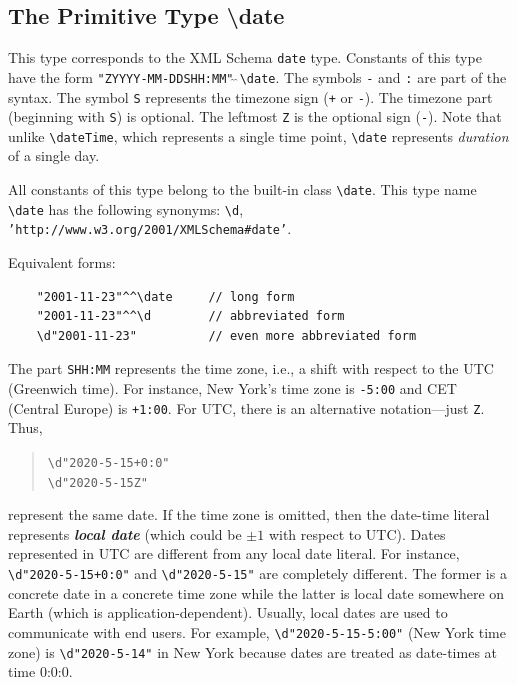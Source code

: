 \documentclass[11pt]{article}
\newcommand{\bs}{\textbackslash}
\begin{document}
\subsection{ The Primitive Type \bs{}date}

\index{datatype!\bs{}date}
This type corresponds to the XML Schema {\tt date} type.  Constants of this
type have the form {\tt "ZYYYY-MM-DDSHH:MM"$\hat{~}\hat{~}$\bs{}date}.  The
symbols {\tt -} and {\tt :} are part of the syntax. The symbol {\tt S}
represents the timezone sign ({\tt +} or {\tt -}). The timezone part
(beginning with {\tt S}) is optional. The leftmost {\tt Z} is the optional
sign ({\tt -}). Note that unlike {\tt \bs{}dateTime}, which represents a
single time point, {\tt \bs{}date}  represents \emph{duration} of a single day.


\index{class!\bs{}date}
All constants of this type belong to the built-in class {\tt \bs{}date}. 
This type name {\tt \bs{}date} has the following synonyms: 
{\tt \bs{}d},  {\tt 'http://www.w3.org/2001/XMLSchema\#date'}. 

\noindent
Equivalent forms:
\begin{verbatim}
    "2001-11-23"^^\date     // long form
    "2001-11-23"^^\d        // abbreviated form
    \d"2001-11-23"          // even more abbreviated form
\end{verbatim}

The part \texttt{SHH:MM} represents the time zone, i.e., a shift with
respect to the UTC (Greenwich time). For instance, New York's time zone is
\texttt{-5:00} and CET (Central Europe) is \texttt{+1:00}.  For UTC, there
is an alternative notation---just \texttt{Z}. Thus,
\begin{quote}
 \verb|\d"2020-5-15+0:0"|
 \\
 \verb|\d"2020-5-15Z"| 
\end{quote}
represent the same date.  If the time zone is omitted, then the
date-time literal represents \emph{\textbf{local date}}
(which could be $\pm 1$ with respect to UTC).
Dates represented in UTC are different from any local date literal.
For instance, \verb|\d"2020-5-15+0:0"| and
\verb|\d"2020-5-15"| are completely different. The former is a
concrete date in a concrete time zone while the latter is local date
somewhere on Earth (which is application-dependent).
Usually, local dates are used to communicate with end users.
For example, \verb|\d"2020-5-15-5:00"| (New York time zone) is
\verb|\d"2020-5-14"| in New York because dates are treated as date-times
at time 0:0:0.
\end{document}
